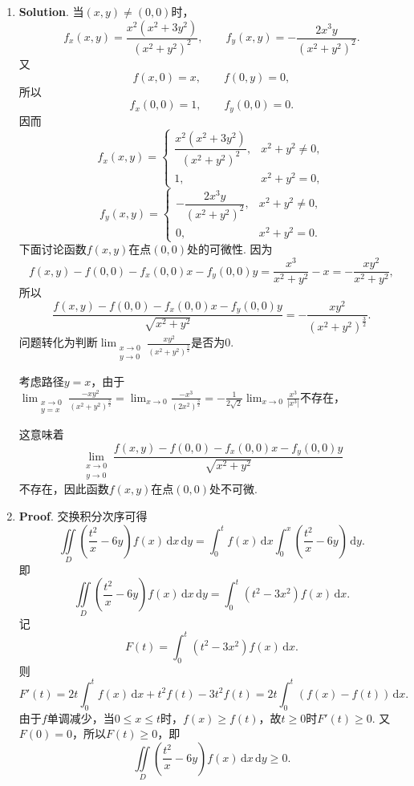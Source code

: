 \documentclass[../main.tex]{subfiles}
\begin{document}
\begin{enumerate}
    \item \textbf{Solution}. 当$(x,y)\ne(0,0)$时，
          \[
              f_x(x,y)=\frac{x^2(x^2+3y^2)}{(x^2+y^2)^2},\qquad
              f_y(x,y)=-\frac{2x^3y}{(x^2+y^2)^2}.
          \]
          又
          \[
              f(x,0)=x,\qquad f(0,y)=0,
          \]
          所以
          \[
              f_x(0,0)=1,\qquad f_y(0,0)=0.
          \]
          因而
          \[
              f_x(x,y)=
              \begin{cases}
                  \dfrac{x^2(x^2+3y^2)}{(x^2+y^2)^2}, & x^2+y^2\ne0, \\[0.6em]
                  1,                                  & x^2+y^2=0,
              \end{cases}
          \]
          \[
              f_y(x,y)=
              \begin{cases}
                  -\dfrac{2x^3y}{(x^2+y^2)^2}, & x^2+y^2\ne0, \\[0.6em]
                  0,                           & x^2+y^2=0.
              \end{cases}
          \]
          下面讨论函数$f(x,y)$在点$(0,0)$处的可微性. 因为
          \[
              f(x,y)-f(0,0)-f_x(0,0)x-f_y(0,0)y
              =\frac{x^3}{x^2+y^2}-x=-\frac{xy^2}{x^2+y^2},
          \]
          所以
          \[
              \frac{f(x,y)-f(0,0)-f_x(0,0)x-f_y(0,0)y}{\sqrt{x^2+y^2}}
              =-\frac{xy^2}{(x^2+y^2)^{\frac{3}{2}}}.
          \]
          问题转化为判断$\lim_{\substack{x\to0 \\ y\to0}}\frac{xy^2}{(x^2+y^2)^{\frac{3}{2}}}$是否为$0$.

          考虑路径$y=x$，由于$\lim_{\substack{x\to0 \\ y=x}}\frac{-xy^2}{(x^2+y^2)^{\frac{3}{2}}}=\lim_{x\to0}\frac{-x^3}{\left(2x^2\right)^{\frac{3}{2}}}=-\frac{1}{2\sqrt{2}}\lim_{x\to0}\frac{x^3}{\left|x^3\right|}$不存在，

          这意味着
          \[
              \lim_{\substack{x\to0 \\ y\to0}}\frac{f(x,y)-f(0,0)-f_x(0,0)x-f_y(0,0)y}{\sqrt{x^2+y^2}}
          \]
          不存在，因此函数$f(x,y)$在点$(0,0)$处不可微.

    \item \textbf{Proof}. 交换积分次序可得
          \[
              \iint\limits_D\left(\frac{t^2}{x}-6y\right)f(x)\,\mathrm{d}x\,\mathrm{d}y
              =\int_0^t f(x)\,\mathrm{d}x\int_0^x\left(\frac{t^2}{x}-6y\right)\,\mathrm{d}y.
          \]
          即
          \[
              \iint\limits_D\left(\frac{t^2}{x}-6y\right)f(x)\,\mathrm{d}x\,\mathrm{d}y
              =\int_0^t(t^2-3x^2)f(x)\,\mathrm{d}x.
          \]
          记
          \[
              F(t)=\int_0^t(t^2-3x^2)f(x)\,\mathrm{d}x.
          \]
          则
          \[
              F'(t)=2t\int_0^t f(x)\,\mathrm{d}x+t^2f(t)-3t^2f(t)
              =2t\int_0^t(f(x)-f(t))\,\mathrm{d}x.
          \]
          由于$f$单调减少，当$0\le x\le t$时，$f(x)\ge f(t)$，故$t\ge0$时$F'(t)\ge0$. 又$F(0)=0$，所以$F(t)\ge0$，即
          \[
              \iint\limits_D\left(\frac{t^2}{x}-6y\right)f(x)\,\mathrm{d}x\,\mathrm{d}y\ge0.
          \]
\end{enumerate}
\end{document}
